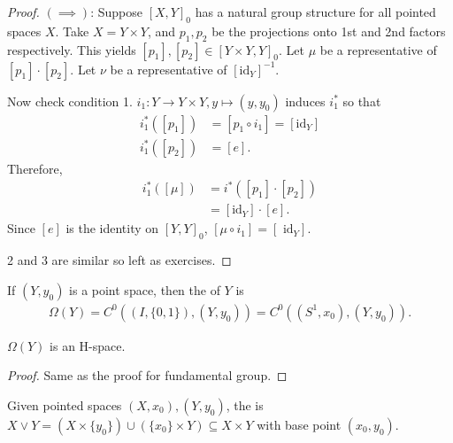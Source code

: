 \documentclass[12pt,class=article,crop=false]{standalone}
\begin{document}
\begin{proof}
	$ (\implies)$: Suppose $ [X,Y]_0$ has a natural group structure for all pointed spaces $ X$.  Take $ X = Y \times Y$, and $ p_1,p_2$ be the projections onto 1st and 2nd factors respectively. This yields $ [p_1], [p_2] \in [Y\times Y,Y]_0$. Let $ \mu$ be a representative of $ [p_1] \cdot [p_2]$. Let $\nu$ be a representative of $ [\text{id}_Y ]^{-1} $.

	Now check condition 1. $ i_1: Y \to Y \times Y, y \mapsto  (y,y_0)$ induces $ i_1^* $ so that
	\begin{align*}
		i_1^* ([p_1]) &= [p_1 \circ i_1] = [ \text{id}_Y ]\\
		i_1^* ([p_2]) &= [e]. 
	\end{align*}
	Therefore,
	\begin{align*}
		i_1^* ([\mu]) &=i^* ([p_1] \cdot [p_2]) \\ 
			      &= [ \text{id}_Y ] \cdot [ e].
	\end{align*}
	Since $ [e]$ is the identity on $ [Y,Y]_0$, $ [\mu \circ i_1] = [\text{ id}_Y ]$.

	2 and 3 are similar so left as exercises.
\end{proof}

\begin{defn}
If $ (Y,y_0)$ is a point space, then the  of $ Y$ is
 \begin{align*}
	 \Omega(Y) = C^{0}((I, \{0,1\} ),(Y,y_0)) = C^{0}((S^{1},x_0),(Y,y_0)).
\end{align*}
\end{defn}

\begin{lem}
$ \Omega(Y)$ is an H-space.
\end{lem}
\begin{proof}
Same as the proof for fundamental group. 
\end{proof}

\begin{defn}
Given pointed spaces $ (X,x_0), (Y,y_0)$, the  is $ X \vee Y = (X \times \{y_0\}) \cup (\{x_0\}  \times Y) \subseteq X \times Y$ with base point $ (x_0,y_0)$. 
\end{defn}
\end{document}
